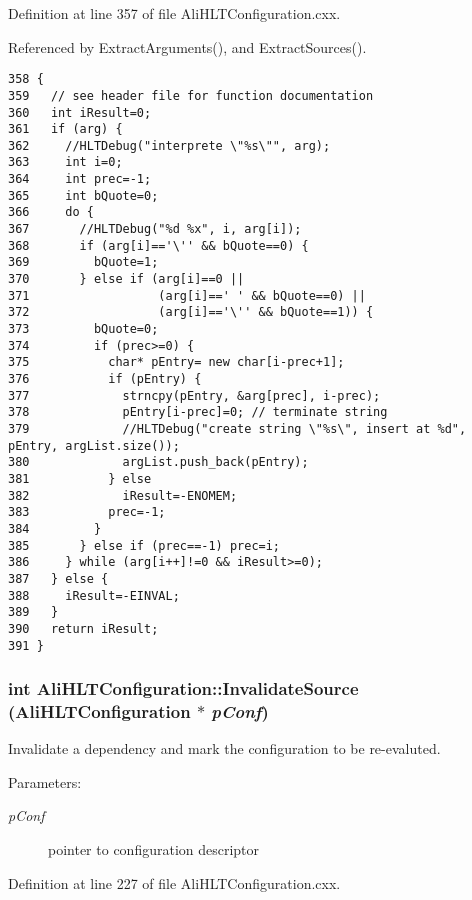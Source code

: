 Definition at line 357 of file Ali\-HLTConfiguration.cxx.

Referenced by Extract\-Arguments(), and Extract\-Sources().

\footnotesize\begin{verbatim}358 {
359   // see header file for function documentation
360   int iResult=0;
361   if (arg) {
362     //HLTDebug("interprete \"%s\"", arg);
363     int i=0;
364     int prec=-1;
365     int bQuote=0;
366     do {
367       //HLTDebug("%d %x", i, arg[i]);
368       if (arg[i]=='\'' && bQuote==0) {
369         bQuote=1;
370       } else if (arg[i]==0 || 
371                  (arg[i]==' ' && bQuote==0) ||
372                  (arg[i]=='\'' && bQuote==1)) {
373         bQuote=0;
374         if (prec>=0) {
375           char* pEntry= new char[i-prec+1];
376           if (pEntry) {
377             strncpy(pEntry, &arg[prec], i-prec);
378             pEntry[i-prec]=0; // terminate string
379             //HLTDebug("create string \"%s\", insert at %d", pEntry, argList.size());
380             argList.push_back(pEntry);
381           } else 
382             iResult=-ENOMEM;
383           prec=-1;
384         }
385       } else if (prec==-1) prec=i;
386     } while (arg[i++]!=0 && iResult>=0); 
387   } else {
388     iResult=-EINVAL;
389   }
390   return iResult;
391 }
\end{verbatim}\normalsize 


\subsubsection{\setlength{\rightskip}{0pt plus 5cm}int Ali\-HLTConfiguration::Invalidate\-Source ({\bf Ali\-HLTConfiguration} $\ast$ {\em p\-Conf})}\label{classAliHLTConfiguration_a14}


Invalidate a dependency and mark the configuration to be re-evaluted. \begin{Desc}
\item[Parameters:]
\begin{description}
\item[{\em p\-Conf}]pointer to configuration descriptor \end{description}
\end{Desc}


Definition at line 227 of file Ali\-HLTConfiguration.cxx.

